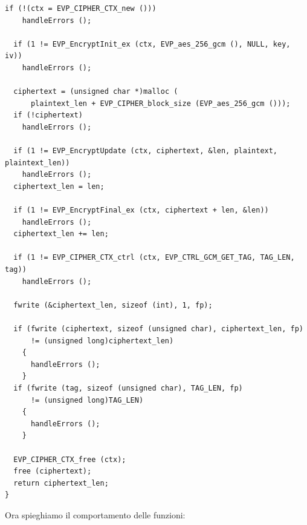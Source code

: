 \begin{lstlisting}[style=C, caption=Esempio di decrypt e decrypt con gcm, label=C-gcm-expl]
  if (!(ctx = EVP_CIPHER_CTX_new ()))
    handleErrors ();

  if (1 != EVP_EncryptInit_ex (ctx, EVP_aes_256_gcm (), NULL, key, iv))
    handleErrors ();

  ciphertext = (unsigned char *)malloc (
      plaintext_len + EVP_CIPHER_block_size (EVP_aes_256_gcm ()));
  if (!ciphertext)
    handleErrors ();

  if (1 != EVP_EncryptUpdate (ctx, ciphertext, &len, plaintext, plaintext_len))
    handleErrors ();
  ciphertext_len = len;

  if (1 != EVP_EncryptFinal_ex (ctx, ciphertext + len, &len))
    handleErrors ();
  ciphertext_len += len;

  if (1 != EVP_CIPHER_CTX_ctrl (ctx, EVP_CTRL_GCM_GET_TAG, TAG_LEN, tag))
    handleErrors ();

  fwrite (&ciphertext_len, sizeof (int), 1, fp);

  if (fwrite (ciphertext, sizeof (unsigned char), ciphertext_len, fp)
      != (unsigned long)ciphertext_len)
    {
      handleErrors ();
    }
  if (fwrite (tag, sizeof (unsigned char), TAG_LEN, fp)
      != (unsigned long)TAG_LEN)
    {
      handleErrors ();
    }

  EVP_CIPHER_CTX_free (ctx);
  free (ciphertext);
  return ciphertext_len;
}
\end{lstlisting}
Ora spieghiamo il comportamento delle funzioni:
